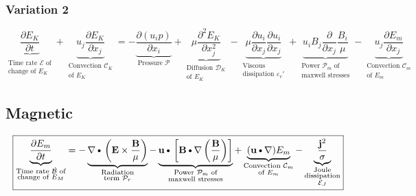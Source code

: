\documentclass[11pt]{article}
\newcommand{\B}{\mathbf{B}}
\newcommand{\MC}{\mathcal}
\newcommand{\PD}{\partial}
\newcommand{\BM}{\frac{\mathbf{B}}{\mu}}
\newcommand{\E}{\mathbf{E}}
\newcommand{\JSS}{\frac{\mathbf{j}^2}{\sigma}}
\newcommand{\U}{\mathbf{u}}
\newcommand{\DOT}{\text{\textbullet}}
\begin{document}
\subsubsection{Variation 2}
\begin{equation}
	\boxed{
	\underbrace{\frac{\PD E_K}{\PD t}}_{\substack{\text{Time rate $\dot{\MC E}$ of} \\ \text{change of $E_K$}}} + 
	\underbrace{u_j \frac{\PD E_K}{\PD x_j}}_
	{\substack{\text{Convection } \MC C_K \\\text{of $E_K$}}}
	= 
	- \underbrace{\frac{\PD (u_i p)}{\PD x_i}}_{\text{Pressure } \MC P} 
	+ \underbrace{ \mu \frac{\PD^2 E_K}{\PD x_j^2} }_{\substack{\text{Diffusion } \MC D_K \\ \text{of $E_K$ }}}
	- \underbrace{\mu \frac{\PD u_i}{\PD x_j}\frac{\PD u_i}{\PD x_j} }_{\substack{\text{Viscous } \\ \text{dissipation } \varepsilon_v'}}
	+ \underbrace{u_i B_j \frac{\PD}{\PD x_j} \frac{B_i}{\mu}}_
	{\substack{\text{Power $\MC P_{m}$ of}\\\text{maxwell stresses}}}
	- \underbrace{u_j \frac{\PD E_m}{\PD x_j}}_
	{\substack{\text{Convection $\MC C_m$}\\\text{of $E_m$}}}
	}
\end{equation}

\subsection{Magnetic}
\begin{equation}
	\boxed{
	\underbrace{\frac{\PD E_m}{\PD t} }_
	{\substack{\text{Time rate $\dot{\MC B}$ of}\\\text{change of $E_M$}}}
	=
	- \underbrace{\nabla \DOT \left(\E \times \BM \right)}_
	{\substack{\text{Radiation}\\\text{term $\MC P_{r}$}}}
	- \underbrace{\U \DOT \left[\B \DOT \nabla \left( \BM \right) \right]}_
	{\substack{\text{Power $\MC P_{m}$ of}\\\text{maxwell stresses}}}
	+ \underbrace{(\U \DOT \nabla) E_m}_
	{\substack{\text{Convection $\MC C_m$}\\\text{of $E_m$}}}
	- \underbrace{\JSS}_
	{\substack{\text{Joule}\\\text{dissipation}\\\text{$\MC E_J$}}}
	}
\end{equation}
\end{document}
